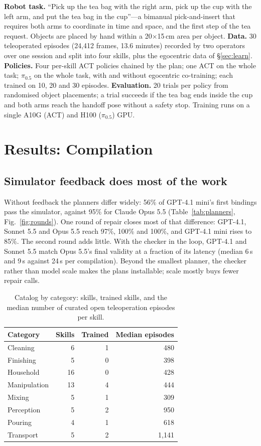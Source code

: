 \documentclass[10pt,twocolumn,letterpaper]{article}
\newif\ifprovisional \provisionaltrue
\newcommand{\prov}[1]{\ifprovisional\textcolor{prov}{#1}\else#1\fi}
\begin{document}
\textbf{Robot task.} ``Pick up the tea bag with the right arm, pick up the cup with the left arm, and put the tea bag
in the cup''---a bimanual pick-and-insert that requires both arms to coordinate in time and space, and the first step
of the tea request. Objects are placed by hand within a \prov{20$\times$15\,cm} area per object. \textbf{Data.} 30
teleoperated episodes (24{,}412 frames, 13.6 minutes) recorded by two operators over one session and split into four
skills, plus the egocentric data of \S\ref{sec:learn}. \textbf{Policies.} Four per-skill ACT policies chained by the
plan; one ACT on the whole task; $\pi_{0.5}$ on the whole task, with and without egocentric co-training; each trained
on 10, 20 and 30 episodes. \textbf{Evaluation.} \prov{20} trials per policy from randomised
object placements; a trial succeeds if the tea bag ends inside the cup and both arms reach the handoff pose without a
safety stop. Training runs on a single \prov{A10G} (ACT) and \prov{H100} ($\pi_{0.5}$) GPU.

\section{Results: Compilation}\label{sec:res-compile}
\subsection{Simulator feedback does most of the work}
Without feedback the planners differ widely: 56\% of GPT-4.1 mini's first bindings pass the simulator, against 95\%
for Claude Opus 5.5 (Table~\ref{tab:planners}, Fig.~\ref{fig:rounds}). One round of repair closes most of that
difference: GPT-4.1, Sonnet 5.5 and Opus 5.5 reach 97\%, 100\% and 100\%, and GPT-4.1 mini rises to 85\%. The second
round adds little. With the checker in the loop, GPT-4.1 and Sonnet 5.5 match Opus 5.5's final validity at a fraction
of its latency (median 6\,s and 9\,s against 24\,s per compilation). Beyond the smallest planner, the checker rather
than model scale makes the plans installable; scale mostly buys fewer repair calls.

\begin{table}[t]
\centering\small
\caption{Catalog by category: skills, trained skills, and the median number of curated open teleoperation episodes
per skill.}
\label{tab:catalog}
\begin{tabular}{@{}lrrr@{}}
\toprule
Category & Skills & Trained & Median episodes\\
\midrule
Cleaning & 6 & 1 & 480\\
Finishing & 5 & 0 & 398\\
Household & 16 & 0 & 428\\
Manipulation & 13 & 4 & 444\\
Mixing & 5 & 1 & 309\\
Perception & 5 & 2 & 950\\
Pouring & 4 & 1 & 618\\
Transport & 5 & 2 & 1{,}141\\
\bottomrule
\end{tabular}
\end{table}
\end{document}

